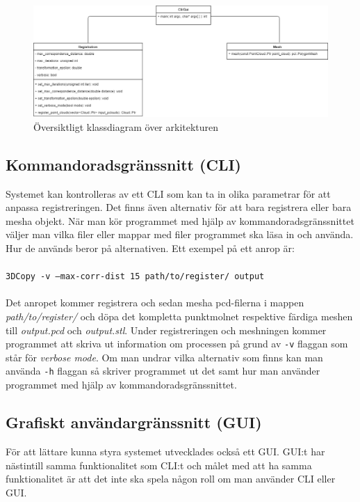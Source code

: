 \begin{figure}[H]
	\centering
	\includegraphics[width=130mm]{figures/klassdiagram.png}
	\caption{Översiktligt klassdiagram över arkitekturen}
	\label{fig:class_diagram}
\end{figure}

\subsection{Kommandoradsgränssnitt (CLI)}

Systemet kan kontrolleras av ett CLI som kan ta in olika parametrar för att anpassa registreringen. Det finns även alternativ för att bara registrera eller bara mesha objekt. När man kör programmet med hjälp av kommandoradsgränssnittet väljer man vilka filer eller mappar med filer programmet ska läsa in och använda. Hur de används beror på alternativen. Ett exempel på ett anrop är:\\\\
\texttt{3DCopy -v --max-corr-dist 15 path/to/register/ output}\\\\
Det anropet kommer registrera och sedan mesha pcd-filerna i mappen \textit{path/to/register/} och döpa det kompletta punktmolnet respektive färdiga meshen till \textit{output.pcd} och \textit{output.stl}. Under registreringen och meshningen kommer programmet att skriva ut information om processen på grund av \texttt{-v} flaggan som står för \textit{verbose mode}. Om man undrar vilka alternativ som finns kan man använda \texttt{-h} flaggan så skriver programmet ut det samt hur man använder programmet med hjälp av kommandoradsgränssnittet. 

\subsection{Grafiskt användargränssnitt (GUI)}
För att lättare kunna styra systemet utvecklades också ett GUI. GUI:t har nästintill samma funktionalitet som CLI:t och målet med att ha samma funktionalitet är att det inte ska spela någon roll om man använder CLI eller GUI.

